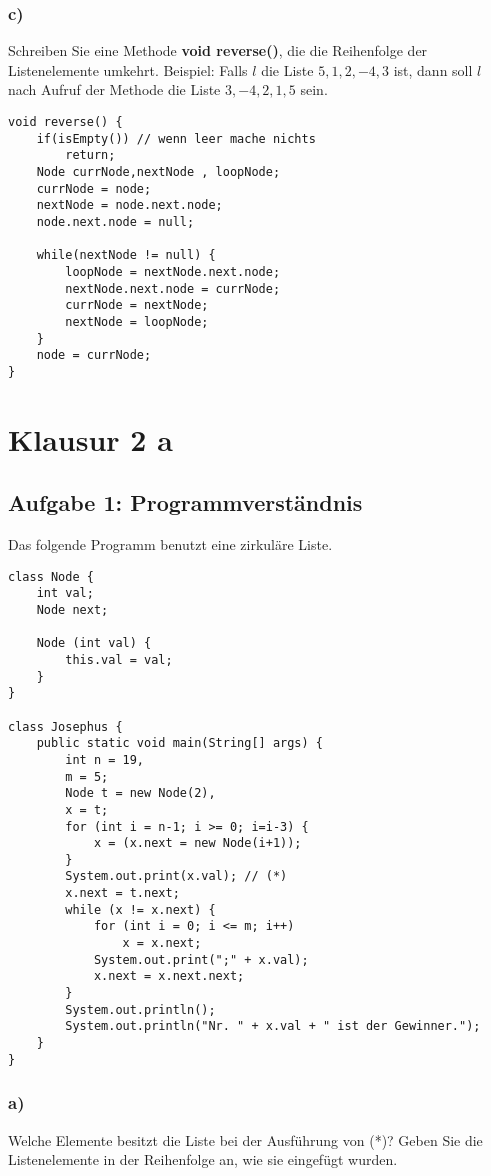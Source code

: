 \documentclass[a4paper, 10pt]{article}
\begin{document}
\subsubsection*{c)}
Schreiben Sie eine Methode \textbf{void reverse()}, die die Reihenfolge der Listenelemente
umkehrt. Beispiel: Falls $l$ die Liste $5, 1, 2,-4, 3$ ist, dann soll $l$ nach Aufruf der
Methode die Liste $3,-4, 2, 1, 5$ sein.

\begin{lstlisting}
void reverse() {
    if(isEmpty()) // wenn leer mache nichts
        return;
    Node currNode,nextNode , loopNode;
    currNode = node; 
    nextNode = node.next.node; 
    node.next.node = null;

    while(nextNode != null) {
        loopNode = nextNode.next.node;
        nextNode.next.node = currNode;
        currNode = nextNode;
        nextNode = loopNode;
    }
    node = currNode;
}
\end{lstlisting}

\section*{Klausur 2 a}
\subsection*{Aufgabe 1: Programmverständnis}
Das folgende Programm benutzt eine zirkuläre Liste.
\begin{lstlisting}
class Node {
	int val;
	Node next;
	
	Node (int val) {
		this.val = val;
	}
}

class Josephus {
	public static void main(String[] args) {
		int n = 19,
		m = 5;
		Node t = new Node(2),
		x = t;
		for (int i = n-1; i >= 0; i=i-3) {
			x = (x.next = new Node(i+1));
		}
		System.out.print(x.val); // (*)
		x.next = t.next;
		while (x != x.next) {
			for (int i = 0; i <= m; i++)
				x = x.next;
			System.out.print(";" + x.val);
			x.next = x.next.next;
		}
		System.out.println();
		System.out.println("Nr. " + x.val + " ist der Gewinner.");
	}
}
\end{lstlisting}

\subsubsection*{a)}
Welche Elemente besitzt die Liste bei der Ausführung von (*)? Geben Sie die Listenelemente in der Reihenfolge an, wie sie eingefügt wurden.\\
\end{document}
